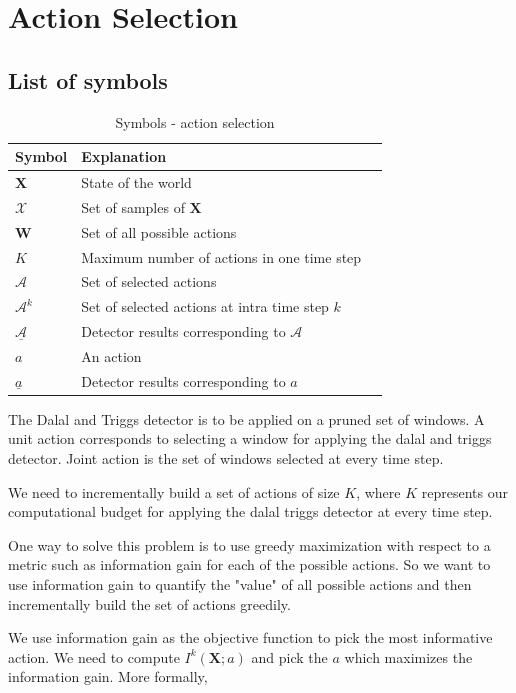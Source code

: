 \documentclass[10pt,twocolumn,letterpaper]{article}
\begin{document}
\section{Action Selection}

\subsection{List of symbols}
\begin{table}[ht]
  \begin{tabular}{lll}
   \hline
   Symbol & Explanation \\
   \hline
$\textbf{X} $ & State of the world\\
 $\mathcal{X} $ & Set of samples of $\textbf{X}$ \\
 $\textbf{W} $ & Set of all possible actions\\
 $K$ & Maximum number of actions in one time step\\
 $\mathcal{A} $ & Set of selected actions\\
 $\mathcal{A}^{k} $ & Set of selected actions at intra time step $k$\\
 $\underline{\mathcal{A}} $ & Detector results corresponding to $\mathcal{A}$\\
 $a $ & An action\\
 $ \underline{a} $ & Detector results corresponding to $ a$\\
   \hline
  \end{tabular}
  \caption{
    Symbols - action selection
  }
  \label{tab:Symbols in action selection}
\end{table}

The Dalal and Triggs detector is to be applied on a pruned set of windows. A unit action corresponds to selecting a window for applying the dalal and triggs detector. Joint action is the set of windows selected at every time step. 

We need to incrementally build a set of actions of size $ K $, where $ K $ represents our computational budget for applying the dalal triggs detector at every time step. 

One way to solve this problem is to use greedy maximization with respect to a metric such as information gain for each of the possible actions. So we want to use information gain to quantify the "value" of all possible actions and then incrementally build the set of actions greedily.
  
We use information gain as the objective function to pick the most informative action.
We need to compute $I^{k}(\textbf{X};a)$ and pick the $a$ which maximizes the information gain. More formally,
\end{document}
